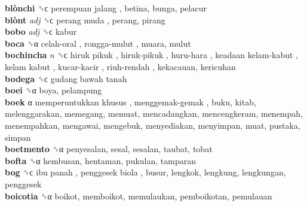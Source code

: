 \textbf{blònchi} ␝ϲ   perempuan jalang , betina, bunga, pelacur  \\
\textbf{blònt} \emph{adj}  ␝ϲ   perang muda , perang, pirang  \\
\textbf{bobo} \emph{adj}  ␝ϲ  kabur  \\
\textbf{boca} ␝α   celah-oral ,  rongga-mulut , muara, mulut  \\
\textbf{bochincha} \emph{n}  ␝ϲ   hiruk pikuk ,  hiruk-pikuk ,  huru-hara ,  keadaan kelam-kabut ,  kelam kabut ,  kucar-kacir ,  riuh-rendah , kekacauan, kericuhan  \\
\textbf{bodega} ␝ϲ   gudang bawah tanah   \\
\textbf{boei} ␝α  boya, pelampung  \\
\textbf{boek} α   memperuntukkan khusus ,  menggemak-gemak , buku, kitab, melenggarakan, memegang, memuat, mencadangkan, mencengkeram, menempah, menempahkan, mengawai, mengebuk, menyediakan, menyimpan, muat, pustaka, simpan  \\
\textbf{boetmento} ␝α  penyesalan, sesal, sesalan, taubat, tobat  \\
\textbf{bofta} ␝α  hembusan, hentaman, pukulan, tamparan  \\
\textbf{bog} ␝ϲ   ibu panah ,  penggesek biola , busur, lengkok, lengkung, lengkungan, penggesek  \\
\textbf{boicotia} ␝α  boikot, memboikot, memulaukan, pemboikotan, pemulauan  \\
